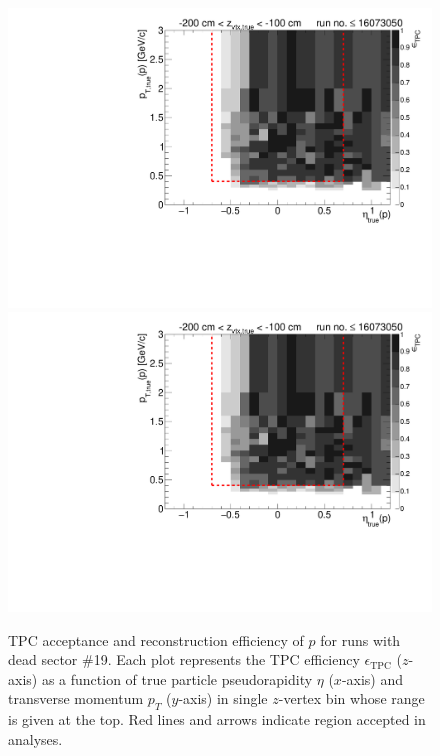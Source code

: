 \begin{figure}[hb]
\caption[TPC acceptance and reconstruction efficiency of $p$ for runs with dead sector \#19.]{TPC acceptance and reconstruction efficiency of $p$ for runs with dead sector \#19. Each plot represents the TPC efficiency $\epsilon_{\text{TPC}}$ ($z$-axis) as a function of true particle pseudorapidity $\eta$ ($x$-axis) and transverse momentum $p_{T}$ ($y$-axis) in single $z$-vertex bin whose range is given at the top. Red lines and arrows indicate region accepted in analyses.}\label{fig:tpcEff_proton_plus}
\centering
\parbox{0.495\textwidth}{
  \centering
  \includegraphics[width=\linewidth,page=3]{graphics/eff/Eff2D_TPC_proton_Plus_RunRange1.pdf}\\
  \includegraphics[width=\linewidth,page=5]{graphics/eff/Eff2D_TPC_proton_Plus_RunRange1.pdf}\\
}
\end{figure}
